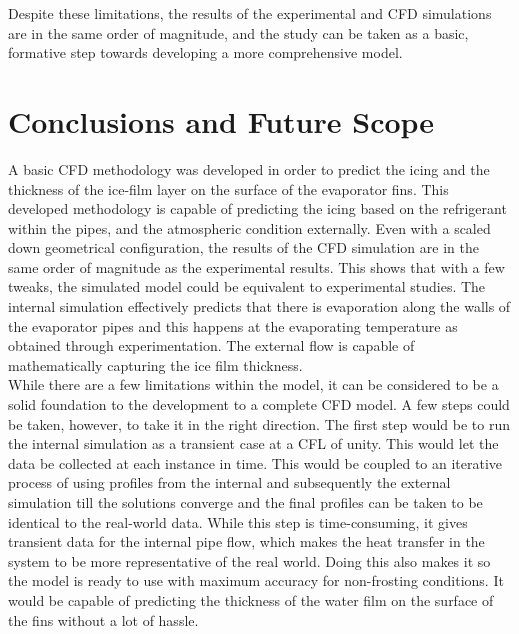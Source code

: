 \documentclass[11pt,a4paper,twoside,oneside]{article}
\begin{document}
Despite these limitations, the results of the experimental and CFD simulations are in the same order of magnitude, and the study can be taken as a basic, formative step towards developing a more comprehensive model.

\clearpage


\section{Conclusions and Future Scope}

\vspace{.6cm}

A basic CFD methodology was developed in order to predict the icing and the thickness of the ice-film layer on the surface of the evaporator fins. This developed methodology is capable of predicting the icing based on the refrigerant within the pipes, and the atmospheric condition externally. Even with a scaled down geometrical configuration, the results of the CFD simulation are in the same order of magnitude as the experimental results. This shows that with a few tweaks, the simulated model could be equivalent to experimental studies. The internal simulation effectively predicts that there is evaporation along the walls of the evaporator pipes and this happens at the evaporating temperature as obtained through experimentation. The external flow is capable of mathematically capturing the ice film thickness.\\

While there are a few limitations within the model, it can be considered to be a solid foundation to the development to a complete CFD model. A few steps could be taken, however, to take it in the right direction. The first step would be to run the internal simulation as a transient case at a CFL of unity. This would let the data be collected at each instance in time. This would be coupled to an iterative process of using profiles from the internal and subsequently the external simulation till the solutions converge and the final profiles can be taken to be identical to the real-world data. While this step is time-consuming, it gives transient data for the internal pipe flow, which makes the heat transfer in the system to be more representative of the real world. Doing this also makes it so the model is ready to use with maximum accuracy for non-frosting conditions. It would be capable of predicting the thickness of the water film on the surface of the fins without a lot of hassle. 
\end{document}
